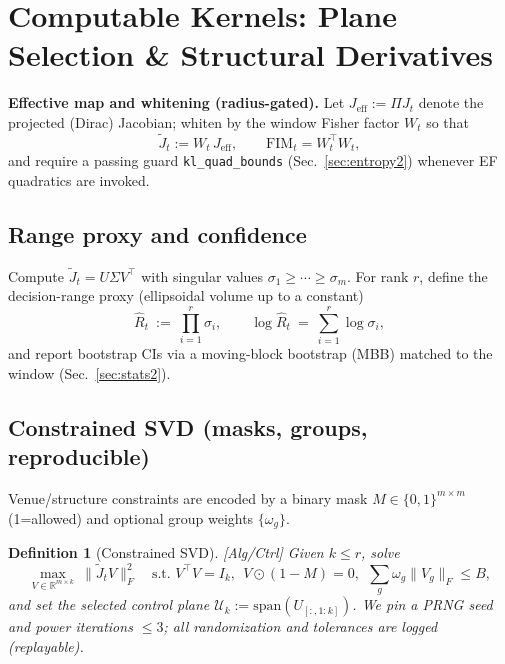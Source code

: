 \documentclass[10pt]{article}
\newcommand{\FIM}{\mathrm{FIM}}
\newcommand{\layertag}[1]{\textup{[#1]}}
\newtheorem{definition}{Definition}
\begin{document}
\section{Computable Kernels: Plane Selection \& Structural Derivatives}\label{sec:kernels2}

\noindent\textbf{Effective map and whitening (radius-gated).}
Let $J_{\mathrm{eff}}:=\Pi J_t$ denote the projected (Dirac) Jacobian; whiten by the window Fisher factor $W_t$ so that
\[
\widetilde J_t := W_t\,J_{\mathrm{eff}}, \qquad \FIM_t=W_t^\top W_t,
\]
and require a passing guard \texttt{kl\_quad\_bounds} (Sec.~\ref{sec:entropy2}) whenever EF quadratics are invoked.

\subsection*{Range proxy and confidence}
Compute $\widetilde J_t=U\Sigma V^\top$ with singular values $\sigma_1\ge\cdots\ge\sigma_m$.
For rank $r$, define the decision-range proxy (ellipsoidal volume up to a constant)
\[
\widehat R_t \ :=\ \prod_{i=1}^r \sigma_i,
\qquad
\log \widehat R_t \ =\ \sum_{i=1}^r \log \sigma_i,
\]
and report bootstrap CIs via a moving-block bootstrap (MBB) matched to the window (Sec.~\ref{sec:stats2}).

\subsection*{Constrained SVD (masks, groups, reproducible)}
Venue/structure constraints are encoded by a binary mask $M\in\{0,1\}^{m\times m}$ (1=allowed) and optional group weights $\{\omega_g\}$.

\begin{definition}[Constrained SVD]\label{def:csvd}
\emph{\layertag{Alg/Ctrl}}
Given $k\!\le\!r$, solve
\[
\max_{V\in\mathbb R^{m\times k}}~ \|\widetilde J_t V\|_F^2
\quad
\text{s.t. } V^\top V=I_k,\ \ V\odot(1{-}M)=0,\ \ \sum_g \omega_g\|V_g\|_F \le B,
\]
and set the selected control plane $\mathcal U_k:=\mathrm{span}(U_{[:,1:k]})$.
We pin a PRNG seed and power iterations $\le 3$; all randomization and tolerances are logged (replayable).
\end{definition}
\end{document}
